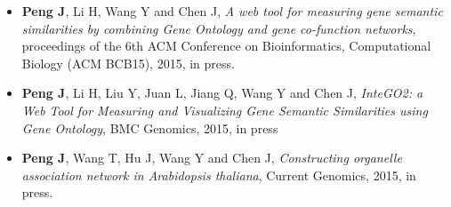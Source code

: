 \documentclass[9.5pt]{article}
\begin{document}
\begin{itemize}
	\item \textbf{Peng J}, Li H, Wang Y and Chen J, \emph{A web tool for measuring gene semantic similarities by combining Gene Ontology and gene co-function networks}, proceedings of the 6th ACM Conference on Bioinformatics, Computational Biology (ACM BCB15), 2015, in press.
%
	\item \textbf{Peng J}, Li H, Liu Y, Juan L, Jiang Q, Wang Y and Chen J, \emph{InteGO2: a Web Tool for Measuring and Visualizing Gene Semantic Similarities using Gene Ontology}, BMC Genomics, 2015, in press
	\item \textbf{Peng J}, Wang T, Hu J, Wang Y and Chen J, \emph{Constructing organelle association network in Arabidopsis thaliana}, Current Genomics, 2015, in press.


\end{itemize}
\end{document}
